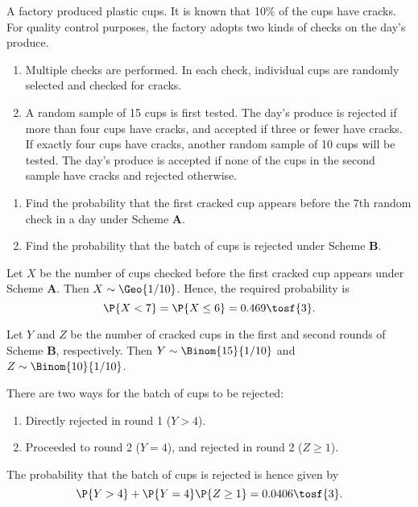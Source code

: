 \begin{problem}
    A factory produced plastic cups. It is known that 10\% of the cups have cracks. For quality control purposes, the factory adopts two kinds of checks on the day's produce.
    
    \renewcommand{\theenumi}{\textbf{\Alph{enumi}}:}
    \begin{enumerate}
        \item Multiple checks are performed. In each check, individual cups are randomly selected and checked for cracks.
        \item A random sample of 15 cups is first tested. The day's produce is rejected if more than four cups have cracks, and accepted if three or fewer have cracks. If exactly four cups have cracks, another random sample of 10 cups will be tested. The day's produce is accepted if none of the cups in the second sample have cracks and rejected otherwise.
    \end{enumerate}
    \renewcommand{\theenumi}{(\alph{enumi})}

    \begin{enumerate}
        \item Find the probability that the first cracked cup appears before the 7th random check in a day under Scheme \textbf{A}.
        \item Find the probability that the batch of cups is rejected under Scheme \textbf{B}.
    \end{enumerate}
\end{problem}
\begin{solution}
    \begin{ppart}
        Let $X$ be the number of cups checked before the first cracked cup appears under Scheme \textbf{A}. Then $X \sim \Geo{1/10}$. Hence, the required probability is \[\P{X < 7} = \P{X \leq 6} = 0.469 \tosf{3}.\]
    \end{ppart}
    \begin{ppart}
        Let $Y$ and $Z$ be the number of cracked cups in the first and second rounds of Scheme \textbf{B}, respectively. Then $Y \sim \Binom{15}{1/10}$ and $Z \sim \Binom{10}{1/10}$.

        There are two ways for the batch of cups to be rejected:
        \renewcommand{\theenumi}{\arabic{enumi}.}%
        \begin{enumerate}
            \item Directly rejected in round 1 ($Y > 4$).
            \item Proceeded to round 2 ($Y = 4$), and rejected in round 2 ($Z \geq 1$).
        \end{enumerate}
        \renewcommand{\theenumi}{(\alph{enumi})}
        
        The probability that the batch of cups is rejected is hence given by \[\P{Y > 4} + \P{Y = 4}\P{Z \geq 1} = 0.0406 \tosf{3}.\]
    \end{ppart}
\end{solution}

